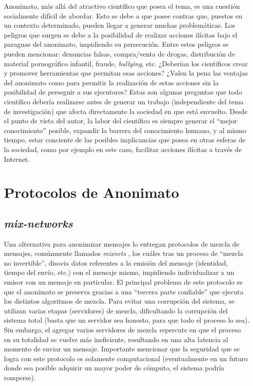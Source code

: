 Anonimato, más allá del atractivo científico que posea el tema, es una cuestión socialmente difícil de abordar. Esto se debe a que 
posee contras que, puestos en un contexto determinado, pueden llegar a generar 
muchas problemáticas. Los peligros que surgen se debe a la posibilidad de realizar acciones ilícitas 
bajo el paraguas del anonimato, impidiendo su persecución. Entre estos peligros se pueden mencionar: 
denuncias falsas, compra/venta de drogas, distribución de material pornográfico infantil, fraude, \emph{bullying}, etc. 
¿Deberían los científicos crear y promover herramientas que permitan esas acciones? 
¿Valen la pena las ventajas del anonimato como para permitir la realización de estas acciones sin la posibilidad de 
perseguir a sus ejecutores?
Estas son algunas preguntas que todo científico 
debería realizarse antes de generar un trabajo (independiente del tema de investigación) que afecta directamente la sociedad en que está envuelto. 
Desde el punto de vista 
del autor, la labor del científico es siempre generar el ``mejor conocimiento'' posible, expandir la barrera del conocimiento 
humano, y al mismo tiempo, estar conciente de las posibles implicancias que posea en otras esferas de la sociedad, como por ejemplo en este caso, 
facilitar acciones ilícitas a través de Internet. 

\section{Protocolos de Anonimato}

\subsection{\emph{mix-networks}}

Una alternativa para anonimizar mensajes lo entregan protocolos de mezcla de mensajes, comúnmente llamados \emph{mixnets} 
\cite{chaum1981untraceable}, los cuáles tras un proceso de ``mezcla no invertible'', disocia datos referentes a la emisión del 
mensaje (identidad, tiempo del envío, etc.) con el mensaje mismo, impidiendo individualizar a un emisor con un mensaje en particular. 
El principal problema de este protocolo es que el anonimato se preserva gracias a una ``tercera parte confiable'' que ejecuta los 
distintos algoritmos de mezcla. Para evitar una corrupción del sistema, se utilizan varias etapas (servidores) de mezcla, dificultando 
la corrupción del sistema total (basta que un servidor sea honesto, para que todo el proceso lo sea). Sin embargo, el agregar varios servidores de 
mezcla repercute en que el proceso en su totalidad se vuelve más ineficiente, resultando en una alta latencia al momento de enviar 
un mensaje. Importante mencionar que la seguridad que se logra con este protocolo es solamente computacional (eventualmente en un futuro 
donde sea posible adquirir un mayor poder de cómputo, el sistema podría romperse).

